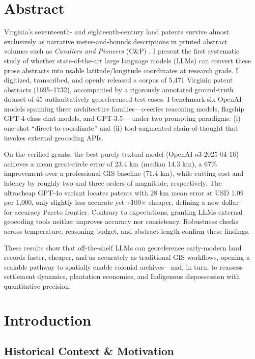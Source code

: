 \section{Abstract}\label{abstract}

Virginia's seventeenth- and eighteenth-century land patents survive
almost exclusively as narrative metes-and-bounds descriptions in printed
abstract volumes such as \emph{Cavaliers and Pioneers} (C\&P)
\citep{Nugent1979_cavaliers3}. I present the first systematic study of
whether state-of-the-art large language models (LLMs) can convert these
prose abstracts into usable latitude/longitude coordinates at research
grade. I digitized, transcribed, and openly released a corpus of 5,471
Virginia patent abstracts (1695--1732), accompanied by a rigorously
annotated ground-truth dataset of 45 authoritatively georeferenced test
cases. I benchmark six OpenAI models spanning three architecture
families---o-series reasoning models, flagship GPT-4-class chat models,
and GPT-3.5--- under two prompting paradigms: (i) one-shot
``direct-to-coordinate'' and (ii) tool-augmented chain-of-thought that
invokes external geocoding APIs.

On the verified grants, the best purely textual model (OpenAI
o3-2025-04-16) achieves a mean great-circle error of 23.4 km (median
14.3 km), a 67\% improvement over a professional GIS baseline (71.4 km),
while cutting cost and latency by roughly two and three orders of
magnitude, respectively. The ultracheap GPT-4o variant locates patents
with 28 km mean error at USD 1.09 per 1,000, only slightly less accurate
yet \textasciitilde100× cheaper, defining a new dollar-for-accuracy
Pareto frontier. Contrary to expectations, granting LLMs external
geocoding tools neither improves accuracy nor consistency. Robustness
checks across temperature, reasoning-budget, and abstract length confirm
these findings.

These results show that off-the-shelf LLMs can georeference early-modern
land records faster, cheaper, and as accurately as traditional GIS
workflows, opening a scalable pathway to spatially enable colonial
archives---and, in turn, to reassess settlement dynamics, plantation
economies, and Indigenous dispossession with quantitative precision.

\section{Introduction}\label{introduction}

\subsection{Historical Context \&
Motivation}\label{historical-context-motivation}

